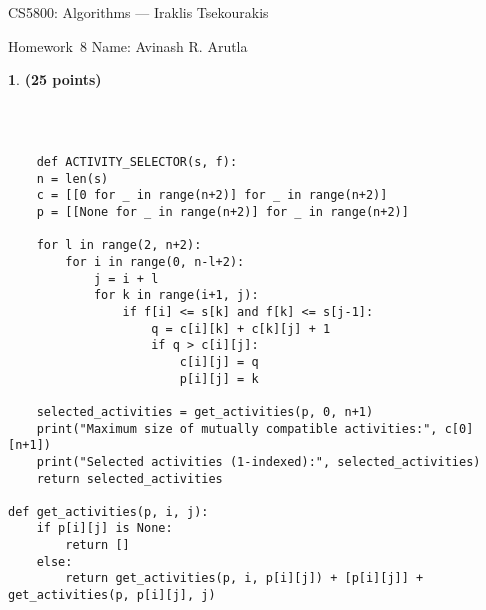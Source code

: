 \documentclass[11pt]{article}
\newcommand{\yourname}{Avinash R. Arutla}
\theoremstyle{definition}
\newcommand{\instructor}{Iraklis Tsekourakis}
\newcommand{\hwnum}{8}
\newtheorem{prob}{}
\newcommand{\solution}{\medskip\noindent{\color{DarkBlue}\textbf{Solution:}}}
\begin{document}
{\Large
\begin{center}{CS5800: Algorithms} --- \instructor \end{center}}
{\large
\vspace{10pt}
\noindent Homework~\hwnum \vspace{2pt}%
}
\bigskip
{\large \noindent Name: \yourname }
\vspace{15pt}





\begin{prob} \textbf{(25 points)}
\end{prob}

\solution \\
\begin{verbatim}

    def ACTIVITY_SELECTOR(s, f):
    n = len(s)
    c = [[0 for _ in range(n+2)] for _ in range(n+2)]
    p = [[None for _ in range(n+2)] for _ in range(n+2)]
    
    for l in range(2, n+2):
        for i in range(0, n-l+2):
            j = i + l
            for k in range(i+1, j):
                if f[i] <= s[k] and f[k] <= s[j-1]:
                    q = c[i][k] + c[k][j] + 1
                    if q > c[i][j]:
                        c[i][j] = q
                        p[i][j] = k
    
    selected_activities = get_activities(p, 0, n+1)
    print("Maximum size of mutually compatible activities:", c[0][n+1])
    print("Selected activities (1-indexed):", selected_activities)
    return selected_activities

def get_activities(p, i, j):
    if p[i][j] is None:
        return []
    else:
        return get_activities(p, i, p[i][j]) + [p[i][j]] + get_activities(p, p[i][j], j)


\end{verbatim}
\end{document}
